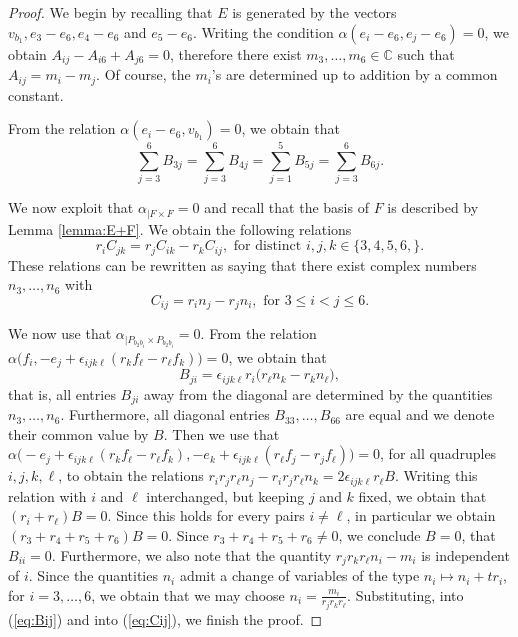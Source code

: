 \documentclass[11pt]{amsart}
\theoremstyle{definition}
\begin{document}
\begin{proof}
We begin by recalling that $E$ is generated by the vectors $v_{b_1}, e_3-e_6, e_4-e_6$ and $e_5-e_6$. Writing the condition $\alpha(e_i-e_6, e_j-e_6)=0$, we obtain $A_{ij}-A_{i6}+A_{j6}=0$, therefore there exist $m_3, \ldots, m_6\in \mathbb C$ such that $A_{ij}=m_i-m_j$. Of course, the $m_i$'s are determined up to addition by a common constant.

\vskip 3pt
From the relation $\alpha(e_i-e_6, v_{b_1})=0$, we obtain that 
$$\sum_{j=3}^6 B_{3j}=\sum_{j=3}^6 B_{4j}=\sum_{j=1}^5 B_{5j}=\sum_{j=3}^6 B_{6j}.$$

We now exploit that $\alpha_{|F\times F}=0$ and recall that the basis of $F$ is described by Lemma \ref{lemma:E+F}. We obtain the following relations
$$r_i C_{jk}=r_j C_{ik}-r_k C_{ij}, \mbox{ for distinct } i, j, k\in \{3,4,5,6,\}.$$
These relations can be rewritten as saying that there exist complex numbers $n_3, \ldots, n_6$ with 
\begin{equation}\label{eq:Cij}
C_{ij}=r_i n_j-r_j n_i, \mbox{ for } 3\leq i<j\leq 6.
\end{equation}

We now use that $\alpha_{|P_{b_2 b_i}\times P_{b_2 b_i}}=0$. From the relation $\alpha\bigl(f_i, -e_j+\epsilon_{ijk\ell}(r_kf_{\ell}-r_{\ell}f_k)\bigr)=0$, we obtain that 
\begin{equation}\label{eq:Bij}
B_{ji}=\epsilon_{ijk\ell} r_i\bigl(r_{\ell} n_k-r_k n_{\ell}\bigr),
\end{equation}
that is, all entries $B_{ji}$ away from the diagonal are determined by the quantities $n_3, \ldots, n_6$. Furthermore, all diagonal entries $B_{33}, \ldots, B_{66}$ are equal and we denote their common value by $B$. Then we use that $\alpha\bigl(-e_j+\epsilon_{ijk\ell}(r_k f_{\ell}-r_{\ell} f_k), -e_k+\epsilon_{ijk\ell}(r_{\ell} f_j-r_jf_{\ell})\bigr)=0$, for all quadruples 
$i, j, k, \ell$, to obtain the relations 
$r_i r_j r_{\ell} n_j-r_i r_j r_{\ell} n_k=2\epsilon_{ijk\ell} r_{\ell}B$. Writing this relation with $i$ and $\ell$ interchanged, but keeping $j$ and $k$ fixed, we obtain that $(r_i+r_{\ell})B=0$. Since this holds for every pairs $i\neq \ell$, in particular we obtain $(r_3+r_4+r_5+r_6)B=0$. Since $r_3+r_4+r_5+r_6\neq 0$, we conclude $B=0$, that $B_{ii}=0$. Furthermore, we also note that the quantity $r_j r_k r_{\ell} n_i-m_i$ is independent of $i$. Since the quantities $n_i$ admit a change of variables of the type $n_i\mapsto n_i+tr_i$, for $i=3, \ldots, 6$, we obtain that we may choose $n_i=\frac{m_i}{r_j r_k r_{\ell}}$. Substituting, into (\ref{eq:Bij}) and into (\ref{eq:Cij}), we finish the proof. 
\end{proof}
\end{document}
